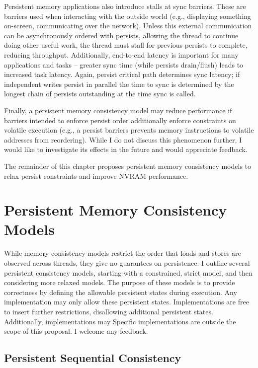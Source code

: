Persistent memory applications also introduce stalls at sync barriers.
These are barriers used when interacting with the outside world (e.g., displaying something on-screen, communicating over the network).
Unless this external communication can be asynchronously ordered with persists, allowing the thread to continue doing other useful work, the thread must stall for previous persists to complete, reducing throughput.
Additionally, end-to-end latency is important for many applications and tasks -- greater sync time (while persists drain/flush) leads to increased task latency.
Again, persist critical path determines sync latency; if independent writes persist in parallel the time to sync is determined by the longest chain of persists outstanding at the time sync is called.

Finally, a persistent memory consistency model may reduce performance if barriers intended to enforce persist order additionally enforce constraints on volatile execution (e.g., a persist barriers prevents memory instructions to volatile addresses from reordering).
While I do not discuss this phenomenon further, I would like to investigate its effects in the future and would appreciate feedback.

The remainder of this chapter proposes persistent memory consistency models to relax persist constraints and improve NVRAM performance.

\section{Persistent Memory Consistency Models}
\label{sec:PMC:PersistenceModels}

While memory consistency models restrict the order that loads and stores are observed across threads, they give no guarantees on persistence.
I outline several persistent consistency models, starting with a constrained, strict model, and then considering more relaxed models.
The purpose of these models is to provide correctness by defining the allowable persistent states during execution.
Any implementation may only allow these persistent states.
Implementations are free to insert further restrictions, disallowing additional persistent states.
Additionally, implementations may 
Specific implementations are outside the scope of this proposal.
I welcome any feedback.

\subsection{Persistent Sequential Consistency}
\label{sec:PMC:PersistenceModels:PSC}

